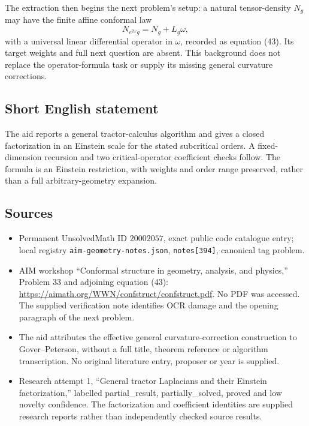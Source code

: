 \documentclass[11pt]{article}
\begin{document}
The extraction then begins the next problem's setup: a natural tensor-density \(N_g\) may have the finite affine conformal law
\[
 N_{e^{2\omega}g}=N_g+L_g\omega,
\]
with a universal linear differential operator in \(\omega\), recorded as equation (43). Its target weights and full next question are absent. This background does not replace the operator-formula task or supply its missing general curvature corrections.
\subsection{Short English statement}
The aid reports a general tractor-calculus algorithm and gives a closed factorization in an Einstein scale for the stated subcritical orders. A fixed-dimension recursion and two critical-operator coefficient checks follow. The formula is an Einstein restriction, with weights and order range preserved, rather than a full arbitrary-geometry expansion.
\subsection{Sources}
\begin{itemize}
\item Permanent UnsolvedMath ID \(20002057\), exact public code catalogue entry; local registry \texttt{aim-geometry-notes.json}, \texttt{notes[394]}, canonical tag problem.
\item AIM workshop ``Conformal structure in geometry, analysis, and physics,'' Problem 33 and adjoining equation (43): \url{https://aimath.org/WWN/confstruct/confstruct.pdf}. No PDF was accessed. The supplied verification note identifies OCR damage and the opening paragraph of the next problem.
\item The aid attributes the effective general curvature-correction construction to Gover--Peterson, without a full title, theorem reference or algorithm transcription. No original literature entry, proposer or year is supplied.
\item Research attempt 1, ``General tractor Laplacians and their Einstein factorization,'' labelled partial\_result, partially\_solved, proved and low novelty confidence. The factorization and coefficient identities are supplied research reports rather than independently checked source results.
\end{itemize}
\end{document}

